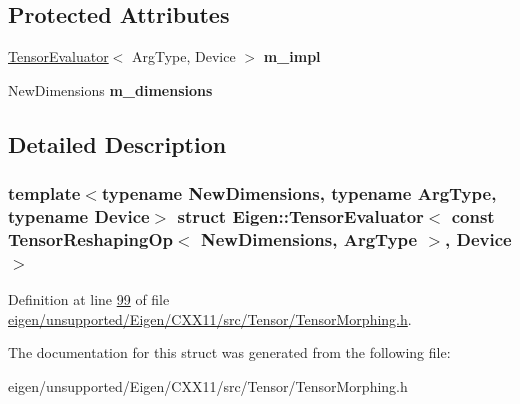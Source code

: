 \subsection*{Protected Attributes}
\begin{DoxyCompactItemize}
\item 
\mbox{\label{struct_eigen_1_1_tensor_evaluator_3_01const_01_tensor_reshaping_op_3_01_new_dimensions_00_01_arg_type_01_4_00_01_device_01_4_a7d16cebf6c35c81321c6a0b2c90b34fe}} 
\hyperlink{struct_eigen_1_1_tensor_evaluator}{Tensor\+Evaluator}$<$ Arg\+Type, Device $>$ {\bfseries m\+\_\+impl}
\item 
\mbox{\label{struct_eigen_1_1_tensor_evaluator_3_01const_01_tensor_reshaping_op_3_01_new_dimensions_00_01_arg_type_01_4_00_01_device_01_4_a5b09ae8f5729eb4bd2446cf138ac0e24}} 
New\+Dimensions {\bfseries m\+\_\+dimensions}
\end{DoxyCompactItemize}


\subsection{Detailed Description}
\subsubsection*{template$<$typename New\+Dimensions, typename Arg\+Type, typename Device$>$\newline
struct Eigen\+::\+Tensor\+Evaluator$<$ const Tensor\+Reshaping\+Op$<$ New\+Dimensions, Arg\+Type $>$, Device $>$}



Definition at line \hyperlink{eigen_2unsupported_2_eigen_2_c_x_x11_2src_2_tensor_2_tensor_morphing_8h_source_l00099}{99} of file \hyperlink{eigen_2unsupported_2_eigen_2_c_x_x11_2src_2_tensor_2_tensor_morphing_8h_source}{eigen/unsupported/\+Eigen/\+C\+X\+X11/src/\+Tensor/\+Tensor\+Morphing.\+h}.



The documentation for this struct was generated from the following file\+:\begin{DoxyCompactItemize}
\item 
eigen/unsupported/\+Eigen/\+C\+X\+X11/src/\+Tensor/\+Tensor\+Morphing.\+h\end{DoxyCompactItemize}
